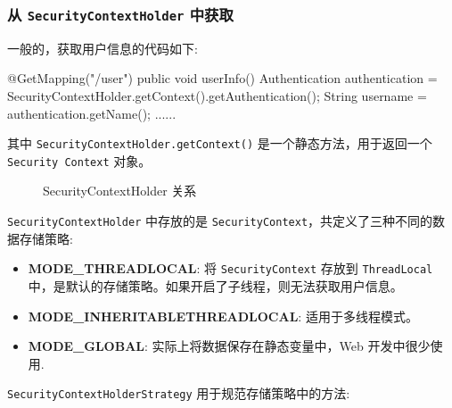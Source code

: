 \subsubsection{从 \texttt{SecurityContextHolder} 中获取}

一般的，获取用户信息的代码如下:

\begin{Java}
@GetMapping("/user")
public void userInfo() {
    Authentication authentication = SecurityContextHolder.getContext().getAuthentication();
    String username = authentication.getName();
    ......
}
\end{Java}

其中 \texttt{SecurityContextHolder.getContext()} 是一个静态方法，用于返回一个  \texttt{Security Context} 对象。

\begin{figure}[H]
  \small
  \centering
  \caption{SecurityContextHolder 关系}
  \label{fig:SecurityContextHolder 关系}
\end{figure}

\texttt{SecurityContextHolder} 中存放的是 \texttt{SecurityContext}，共定义了三种不同的数据存储策略:
\begin{itemize}
  \item \textbf{MODE\_THREADLOCAL}: 将 \texttt{SecurityContext} 存放到 \texttt{ThreadLocal} 中，是默认的存储策略。如果开启了子线程，则无法获取用户信息。
  \item \textbf{MODE\_INHERITABLETHREADLOCAL}: 适用于多线程模式。
  \item \textbf{MODE\_GLOBAL}: 实际上将数据保存在静态变量中，Web 开发中很少使用.
\end{itemize}

\texttt{SecurityContextHolderStrategy} 用于规范存储策略中的方法:

